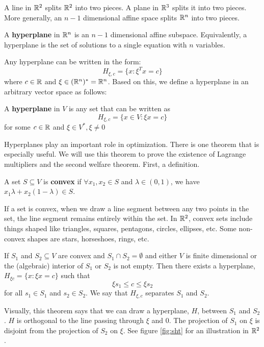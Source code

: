 A line in $\mathbb{R}^2$ splits $\mathbb{R}^2$ into two pieces. A plane in $\mathbb{R}^3$
splits it into two pieces. More generally, an $n-1$ dimensional
affine space splits $\mathbb{R}^n$ into two pieces.
\begin{definition}
  A \textbf{hyperplane} in $\mathbb{R}^n$ is an $n-1$ dimensional affine
  subspace. Equivalently, a hyperplane is the set of solutions to a
  single equation with $n$ variables.
\end{definition}
Any hyperplane can be written in the form:
\[ H_{\xi,c} = \{x: \xi^Tx = c \} \]
where $c \in \mathbb{R}$ and $\xi \in (\mathbb{R}^n)^*=\mathbb{R}^n$. Based on this, we define
a hyperplane in an arbitrary vector space as follows:
\begin{definition}
  A \textbf{hyperplane} in $V$ is any set that can be written as
  \[ H_{\xi,c} = \{x \in V: \xi x = c\} \]
  for some $c \in \mathbb{R}$ and $\xi \in V^*, \xi \neq 0$
\end{definition}
Hyperplanes play an important role in optimization.  There is one
theorem that is especially useful.  We will use this theorem to prove
the existence of Lagrange multipliers and the second welfare
theorem. First, a definition.
\begin{definition}
  A set $S \subseteq V$ is \textbf{convex} if $\forall x_1, x_2 \in
  S$ and $\lambda \in (0,1)$, we have $x_1 \lambda + x_2(1-\lambda)
  \in S$.
\end{definition}
If a set is convex, when we draw a line segment between any two points
in the set, the line segment remains entirely within the set.  In
$\mathbb{R}^2$, convex sets include things shaped like triangles, squares,
pentagons, circles, ellipses, etc. Some non-convex shapes are stars,
horseshoes, rings, etc.
\begin{theorem} \label{thm:sht} If
  $S_1$ and $S_2 \subseteq V$ are convex and
  $S_1 \cap S_2 = \emptyset$ and either $V$ is finite dimensional or
  the (algebraic) interior of $S_1$ or $S_2$ is not empty. Then there
  exists a 
  hyperplane, $H_{\xi c} = \{ x: \xi x = c \}$ such that
  \[ \xi s_1 \leq c \leq \xi s_2 \]
  for all $s_1 \in S_1$ and $s_2 \in S_2$. We say that $H_{\xi,c}$
  separates $S_1$ and $S_2$. 
\end{theorem}
Visually, this theorem says that we can draw a hyperplane, $H$,
between $S_1$ and $S_2$. $H$ is orthogonal to the line passing through
$\xi$ and $0$. The projection of $S_1$ on $\xi$ is disjoint from
the projection of $S_2$ on $\xi$. See figure \ref{fig:sht} for an
illustration in $\mathbb{R}^2$.

